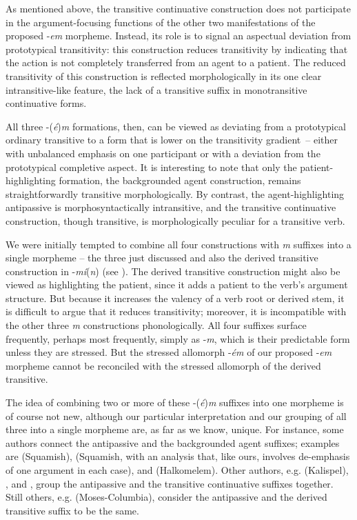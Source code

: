 \documentclass[output=paper,colorlinks,citecolor=brown]{langscibook}
\begin{document}
As mentioned above, the transitive continuative construction does not
participate in the argument-focusing functions of the other two
manifestations of the proposed -\emph{em} morpheme.  Instead, its
role is to signal an aspectual deviation from prototypical
transitivity: this construction reduces transitivity by indicating
that the action is not completely transferred from an agent to a
patient.  The reduced transitivity of this construction is reflected
morphologically in its one clear intransitive-like feature, the lack
of a transitive suffix in monotransitive continuative forms.


All three -(\emph{\'e})\emph{m}  formations, then, can be viewed as
 deviating from a prototypical ordinary transitive to a form that is
 lower on the transitivity gradient~-- either with unbalanced emphasis
 on one participant or with a deviation from the prototypical
 completive aspect.  It is interesting to note that only the
 patient-highlighting formation, the backgrounded agent construction,
 remains straightforwardly transitive morphologically.  By contrast,
 the agent-highlighting antipassive is morphosyntactically
 intransitive, and the transitive continuative construction, though
 transitive, is morphologically peculiar for a transitive verb.


We were initially tempted to combine all four constructions with
\emph{m} suffixes into a single morpheme -- the three just discussed
and also the derived transitive construction in -\emph{m\'i}(\emph{n})
(see \citealt{S.Thomason&Everett:1993}).  The derived transitive
construction might also be viewed as highlighting the patient, since
it adds a patient to the verb's argument structure.  But because it
increases the valency of a verb root or derived stem, it is difficult
to argue that it reduces transitivity; moreover, it is incompatible
with the other three \emph{m} constructions phonologically.  All four
suffixes surface frequently, perhaps most frequently, simply as
-\emph{m}, which is their predictable form unless they are stressed.
But the stressed allomorph -\emph{\'em} of our proposed -\emph{em}
morpheme cannot be reconciled with the stressed allomorph of the
derived transitive.

The idea of combining two or more of these -(\emph{\'e})\emph{m}
 suffixes into one morpheme is of course not new, although our
 particular interpretation and our grouping of all three into a
 single morpheme are, as far as we know, unique.  For instance, some
 authors connect the antipassive and the backgrounded agent suffixes;
 examples are \citet{Kuipers:1967} (Squamish), \citet{Darnell:1990}
 (Squamish, with an analysis that, like ours, involves de-emphasis of
 one argument in each case), and \citet[185]{Gerdts:1989}
 (Halkomelem).  Other authors, e.g. \citet[32]{Vogt:1940}
 (Kalispel), \citet[158--159]{Newman:1980}, and
 \citet[294]{Kroeber:1991}, group the antipassive and the
 transitive continuative suffixes together.  Still others,
 e.g. \citet[105]{Kinkade:1981} (Moses-Columbia), consider the
 antipassive and the derived transitive suffix to be the same.
\end{document}
